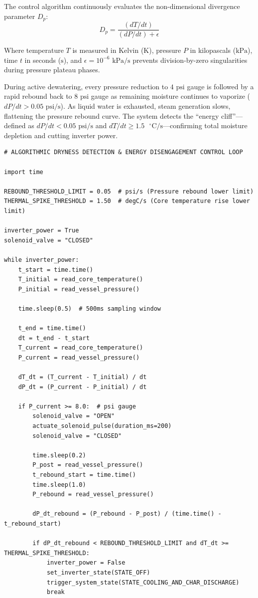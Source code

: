 \documentclass[10pt,twocolumn,a4paper]{article}
\begin{document}
The control algorithm continuously evaluates the non-dimensional divergence parameter $D_p$:
\begin{equation}
D_p = \frac{(dT/dt)}{(dP/dt) + \epsilon}
\end{equation}

Where temperature $T$ is measured in Kelvin ($\text{K}$), pressure $P$ in kilopascals ($\text{kPa}$), time $t$ in seconds ($\text{s}$), and $\epsilon = 10^{-6}\text{ kPa/s}$ prevents division-by-zero singularities during pressure plateau phases.

During active dewatering, every pressure reduction to $4\text{ psi}$ gauge is followed by a rapid rebound back to $8\text{ psi}$ gauge as remaining moisture continues to vaporize ($dP/dt > 0.05\text{ psi/s}$). As liquid water is exhausted, steam generation slows, flattening the pressure rebound curve. The system detects the ``energy cliff''—defined as $dP/dt < 0.05\text{ psi/s}$ and $dT/dt \ge 1.5\text{ }^\circ\text{C/s}$—confirming total moisture depletion and cutting inverter power.

\begin{lstlisting}[caption={Algorithmic Dryness Detection Control Loop}]
# ALGORITHMIC DRYNESS DETECTION & ENERGY DISENGAGEMENT CONTROL LOOP

import time

REBOUND_THRESHOLD_LIMIT = 0.05  # psi/s (Pressure rebound lower limit)
THERMAL_SPIKE_THRESHOLD = 1.50  # degC/s (Core temperature rise lower limit)

inverter_power = True
solenoid_valve = "CLOSED"

while inverter_power:
    t_start = time.time()
    T_initial = read_core_temperature()
    P_initial = read_vessel_pressure()

    time.sleep(0.5)  # 500ms sampling window

    t_end = time.time()
    dt = t_end - t_start
    T_current = read_core_temperature()
    P_current = read_vessel_pressure()

    dT_dt = (T_current - T_initial) / dt
    dP_dt = (P_current - P_initial) / dt

    if P_current >= 8.0:  # psi gauge
        solenoid_valve = "OPEN"
        actuate_solenoid_pulse(duration_ms=200)
        solenoid_valve = "CLOSED"

        time.sleep(0.2)
        P_post = read_vessel_pressure()
        t_rebound_start = time.time()
        time.sleep(1.0)
        P_rebound = read_vessel_pressure()

        dP_dt_rebound = (P_rebound - P_post) / (time.time() - t_rebound_start)

        if dP_dt_rebound < REBOUND_THRESHOLD_LIMIT and dT_dt >= THERMAL_SPIKE_THRESHOLD:
            inverter_power = False
            set_inverter_state(STATE_OFF)
            trigger_system_state(STATE_COOLING_AND_CHAR_DISCHARGE)
            break
\end{lstlisting}
\end{document}

